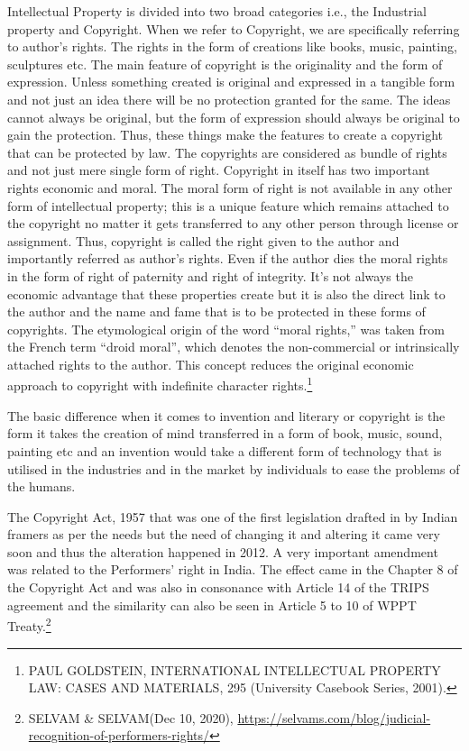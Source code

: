 \begin{multicols}{2}
\noi
Intellectual Property is divided into two broad categories i.e., the Industrial property and
Copyright. When we refer to Copyright, we are specifically referring to author’s rights. The
rights in the form of creations like books, music, painting, sculptures etc. The main feature of
copyright is the originality and the form of expression. Unless something created is original
and expressed in a tangible form and not just an idea there will be no protection granted for
the same. The ideas cannot always be original, but the form of expression should always be
original to gain the protection. Thus, these things make the features to create a copyright that
can be protected by law. The copyrights are considered as bundle of rights and not just mere
single form of right. Copyright in itself has two important rights economic and moral. The
moral form of right is not available in any other form of intellectual property; this is a unique
feature which remains attached to the copyright no matter it gets transferred to any other person through license or assignment. Thus, copyright is called the right given to the author
and importantly referred as author’s rights. Even if the author dies the moral rights in the
form of right of paternity and right of integrity. It’s not always the economic advantage that
these properties create but it is also the direct link to the author and the name and fame that is
to be protected in these forms of copyrights. The etymological origin of the word “moral
rights,” was taken from the French term “droid moral”, which denotes the non-commercial or
intrinsically attached rights to the author. This concept reduces the original economic
approach to copyright with indefinite character rights.\footnote{PAUL GOLDSTEIN, INTERNATIONAL INTELLECTUAL PROPERTY LAW: CASES AND
MATERIALS, 295 (University Casebook Series, 2001).}

\noi
The basic difference when it comes to invention and literary or copyright is the form it takes
the creation of mind transferred in a form of book, music, sound, painting etc and an
invention would take a different form of technology that is utilised in the industries and in the
market by individuals to ease the problems of the humans. 


\noi
The Copyright Act, 1957 that was one of the first legislation drafted in by Indian framers as
per the needs but the need of changing it and altering it came very soon and thus the
alteration happened in 2012. A very important amendment was related to the Performers’
right in India. The effect came in the Chapter 8 of the Copyright Act and was also in
consonance with Article 14 of the TRIPS agreement and the similarity can also be seen in
Article 5 to 10 of WPPT Treaty.\footnote{SELVAM \& SELVAM(Dec 10, 2020), \url{https://selvams.com/blog/judicial-recognition-of-performers-rights/}}


\end{multicols}
